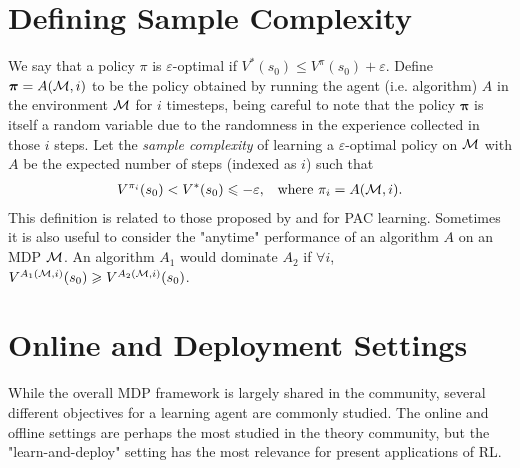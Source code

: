 

\section{Defining Sample Complexity}

We say that a policy $\pi$ is $\varepsilon$-optimal if $V^*(s_0) \le V^\pi(s_0) + \varepsilon$.
Define $\bm{\pi} = A(\mathcal{M}, i)$ to be the policy obtained by running the agent (i.e. algorithm) $A$ in the environment $\mathcal{M}$ for $i$ timesteps, being careful to note that the policy $\bm{\pi}$ is itself a random variable due to the randomness in the experience collected in those $i$ steps.
Let the \emph{sample complexity} of learning a $\varepsilon$-optimal policy on $\mathcal{M}$ with $A$ be the expected number of steps (indexed as $i$) such that
\begin{align}
    V^{\pi_i}(s_0) < V^*(s_0) \leqslant - \varepsilon, && \text{where } \pi_i = A(\mathcal{M}, i).
\end{align}
This definition is related to those proposed by \citet{Fiechter1994EfficientRL} and \citet{strehl2008analysis} for PAC learning.
Sometimes it is also useful to consider the "anytime" performance of an algorithm $A$ on an MDP $\mathcal{M}$.
An algorithm $A_1$ would dominate $A_2$ if $\forall i$, $V^{A_1(\mathcal{M}, i)}(s_0) \geqslant V^{A_2(\mathcal{M}, i)}(s_0)$.



\section{Online and Deployment Settings} \label{sec:regret-deployment}

While the overall MDP framework is largely shared in the community, several different objectives for a learning agent are commonly studied.
The online and offline settings are perhaps the most studied in the theory community, but the "learn-and-deploy" setting has the most relevance for present applications of RL.


